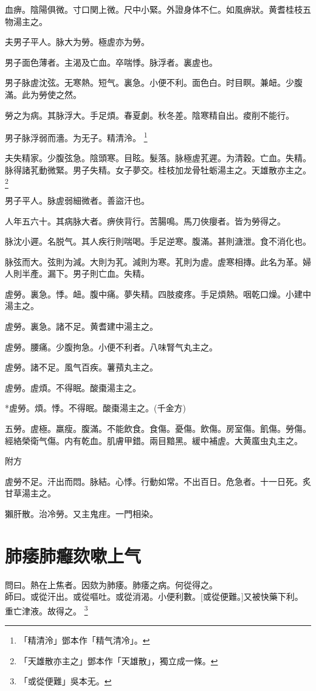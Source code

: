 \documentclass[12pt,twoside,UTF8,b5paper]{ctexbook}
\begin{document}
血痹。陰陽俱微。寸口関上微。尺中小緊。外證身体不仁。如風痹狀。黄耆桂枝五物湯主之。

夫男子平人。脉大为勞。極虗亦为勞。

男子面色薄者。主渴及亡血。卒喘悸。脉浮者。裏虗也。

男子脉虗沈弦。无寒熱。短气。裏急。小便不利。面色白。时目瞑。兼衄。少腹滿。此为勞使之然。

勞之为病。其脉浮大。手足煩。春夏劇。秋冬差。陰寒精自出。痠削不能行。

男子脉浮弱而濇。为无子。精清泠。
	\footnote{「精清泠」鄧本作「精气清冷」。}

夫失精家。少腹弦急。陰頭寒。目眩。髮落。脉極虗芤遲。为清穀。亡血。失精。脉得諸芤動微緊。男子失精。女子夢交。桂枝加龙骨牡蛎湯主之。天雄散亦主之。
	\footnote{「天雄散亦主之」鄧本作「天雄散」，獨立成一條。}

男子平人。脉虗弱細微者。善盜汗也。

人年五六十。其病脉大者。痹俠背行。苦腸鳴。馬刀俠癭者。皆为勞得之。

脉沈小遲。名脱气。其人疾行則喘喝。手足逆寒。腹滿。甚則溏泄。食不消化也。

脉弦而大。弦則为減。大則为芤。減則为寒。芤則为虗。虗寒相摶。此名为革。婦人則半產。漏下。男子則亡血。失精。

虗勞。裏急。悸。衄。腹中痛。夢失精。四肢痠疼。手足煩熱。咽乾口燥。小建中湯主之。

虗勞。裏急。諸不足。黄耆建中湯主之。

虗勞。腰痛。少腹拘急。小便不利者。八味腎气丸主之。

虗勞。諸不足。風气百疾。薯蕷丸主之。

虗勞。虗煩。不得眠。酸棗湯主之。

*虗勞。煩。悸。不得眠。酸棗湯主之。(千金方)

五勞。虗極。羸瘦。腹滿。不能飲食。食傷。憂傷。飲傷。房室傷。飢傷。勞傷。經絡榮衛气傷。内有乾血。肌膚甲錯。兩目黯黑。緩中補虗。大黄䗪虫丸主之。

附方

虗勞不足。汗出而悶。脉結。心悸。行動如常。不出百日。危急者。十一日死。炙甘草湯主之。

獺肝散。治冷勞。又主鬼疰。一門相染。

\chapter{肺痿肺癰欬嗽上气}

問曰。熱在上焦者。因欬为肺痿。肺痿之病。何從得之。\\
師曰。或從汗出。或從嘔吐。或從消渴。小便利數。[或從便難。]又被快藥下利。重亡津液。故得之。
	\footnote{「或從便難」吳本无。}
\end{document}
